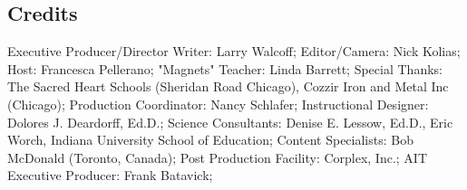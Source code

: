 \subsection{Credits}

Executive Producer/Director Writer: Larry Walcoff;
Editor/Camera: Nick Kolias;
Host: Francesca Pellerano;
"Magnets" Teacher: Linda Barrett;
Special Thanks: The Sacred Heart Schools (Sheridan Road Chicago), Cozzir Iron and Metal Inc (Chicago);
Production Coordinator: Nancy Schlafer;
Instructional Designer: Dolores J. Deardorff, Ed.D.;
Science Consultants: Denise E. Lessow, Ed.D., Eric Worch, Indiana University School of Education;
Content Specialists: Bob McDonald (Toronto, Canada);
Post Production Facility: Corplex, Inc.;
AIT Executive Producer: Frank Batavick;